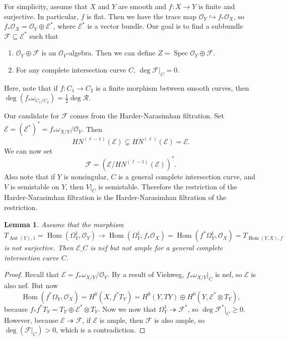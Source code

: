 \documentclass[leqno, openany]{memoir}
\newtheorem{lem}[thm]{Lemma}
\theoremstyle{definition}
\theoremstyle{remark}
\theoremstyle{plain}
\theoremstyle{definition}
\theoremstyle{remark}
\newcommand{\mc}[1]{\mathcal{#1}}
\DeclareMathOperator{\Hom}{Hom}
\DeclareMathOperator{\Aut}{Aut}
\DeclareMathOperator{\Spec}{Spec}
\begin{document}
For simplicity, assume that $X$ and $Y$ are smooth and $f \colon X \to Y$ is finite and surjective. In particular, $f$ is flat. Then we have the trace map $\mc{O}_Y \hookrightarrow f_* \mc{O}_X$, so $f_* \mc{O}_X = \mc{O}_Y \oplus \mc{E}^*$, where $\mc{E}^*$ is a vector bundle. Our goal is to find a subbundle $\mc{F} \subseteq \mc{E}^*$ such that
\begin{enumerate}[(1)]
    \item $\mc{O}_Y \oplus \mc{F}$ is an $\mc{O}_Y$-algebra. Then we can define $Z = \Spec \mc{O}_Y \oplus \mc{F}$.
    \item For any complete intersection curve $C$, $\deg \mc{F} |_C = 0$.
\end{enumerate}
Here, note that if $f \colon C_1 \to C_2$ is a finite morphism between smooth curves, then $\deg (f_* \omega_{C_1 / C_2}) = \frac{1}{{2}} \deg \mc{R}$.

Our candidate for $\mc{F}$ comes from the Harder-Narasimhan filtration. Set $\mc{E} = (\mc{E}^*)^* = f_* \omega_{X/Y} / \mc{O}_Y$. Then
\[ HN^{(\ell-1)} (\mc{E}) \subsetneq HN^{(\ell)}(\mc{E}) = \mc{E}. \]
We can now set
\[ \mc{F} = (\mc{E} / HN^{(\ell-1)}(\mc{E}))^*. \]
Also note that if $Y$ is nonsingular, $C$ is a general complete intersection curve, and $V$ is semistable on $Y$, then $V|_C$ is semistable. Therefore the restriction of the Harder-Narasimhan filtration is the Harder-Narasimhan filtration of the restriction.

\begin{lem}
    Assume that the morphism
    \[ T_{\Aut(Y), 1} = \Hom(\Omega^1_Y, \mc{O}_Y) \to \Hom(\Omega^1_Y, f_* \mc{O}_X) = \Hom(f^* \Omega_Y^1, \mc{O}_X) = T_{\Hom(Y, X), f} \]
    is not surjective. Then $\mc{E}\_C$ is nef but not ample for a general complete intersection curve $C$.
\end{lem}

\begin{proof}
    Recall that $\mc{E} = f_* \omega_{X/Y} / \mc{O}_Y$. By a result of Viehweg, $f_* \omega_{X/Y}|_C$ is nef, so $\mc{E}$ is also nef. But now
    \[ \Hom(f^* \Omega_Y, \mc{O}_X) = H^0(X, f^* T_Y) = H^0(Y, TY) \oplus H^0(Y, \mc{E}^* \otimes T_Y), \]
    because $f_* f^* T_Y = T_Y \oplus \mc{E}^* \otimes T_Y$. Now we now that $\Omega_Y^1 \twoheadrightarrow \mc{F}^*$, so $\deg \mc{F}^* |_C \geq 0$. However, because $\mc{E} \twoheadrightarrow \mc{F}$, if $\mc{E}$ is ample, then $\mc{F}$ is also ample, so $\deg (\mc{F}|_C) > 0$, which is a contradiction.
\end{proof}
\end{document}
